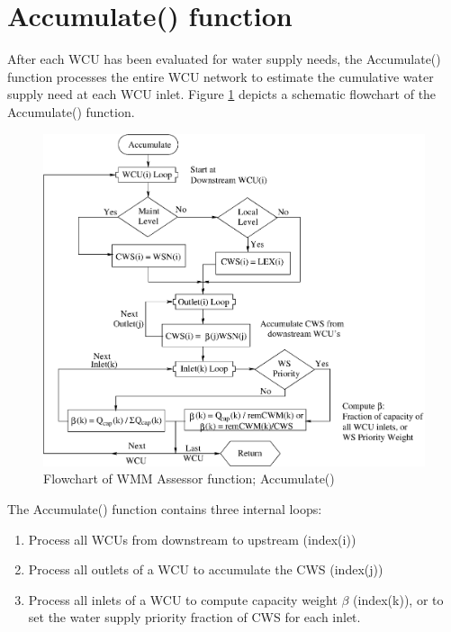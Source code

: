 \section {Accumulate() function}

After each WCU has been evaluated for water supply needs, the
Accumulate() function processes the entire WCU network to estimate the
cumulative water supply need at each WCU inlet. Figure
\ref{fig:flowchartAccumulate} depicts a schematic flowchart of the
Accumulate() function.

\begin{figure}
 \begin{center}
  \includegraphics[scale=.33]{Graphics/flowchartAccumulate.eps}
 \end{center}
 \caption{\label{fig:flowchartAccumulate} Flowchart of WMM Assessor function; Accumulate()}
\end{figure}

The Accumulate() function contains three internal loops: 
\begin{enumerate}
 \item Process all WCUs from downstream to upstream (index(i)) 
 \item Process all outlets of a WCU to accumulate the CWS (index(j)) 
 \item Process all inlets of a WCU to compute capacity weight $\beta$
   (index(k)), or to set the water supply priority fraction of CWS for
   each inlet.
\end{enumerate}

